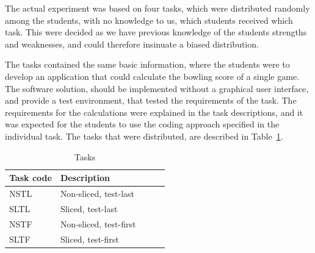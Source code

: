 \documentclass{sig-alternate-05-2015}
\begin{document}
The actual experiment was based on four tasks, which were distributed randomly among the students, with no know\-ledge to us, which students received which task. This were decided as we have previous knowledge of the students strengths and weaknesses, and could therefore insinuate a biased distribution.

The tasks contained the same basic information, where the students were to develop an application that could calculate the bow\-ling score of a single game. The software solution, should be implemented without a graphical user interface, and provide a test environment, that tested the requirements of the task. The requirements for the calculations were explained in the task descriptions, and it was expected for the students to use the coding approach specified in the individual task.
The tasks that were distributed, are described in Table~\ref{TaskTable}.

\begin{table}[!ht]
\centering
\caption{Tasks}
\label{TaskTable}
\begin{tabular}{|l|p{0.68\linewidth}|}
\hline
\textbf{Task code} & \textbf{Description} \\
\hline
\hline
NSTL & Non-sliced, test-last \\
SLTL & Sliced, test-last \\
NSTF & Non-sliced, test-first \\
SLTF & Sliced, test-first\\
\hline
\end{tabular}
\end{table}
\end{document}
